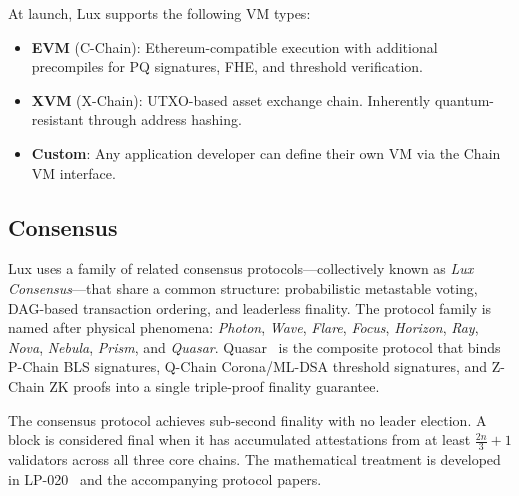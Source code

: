 At launch, Lux supports the following VM types:

\begin{itemize}[nosep]
  \item \textbf{EVM} (C-Chain): Ethereum-compatible execution with
        additional precompiles for PQ signatures, FHE, and threshold
        verification.
  \item \textbf{XVM} (X-Chain): UTXO-based asset exchange chain.
        Inherently quantum-resistant through address hashing.
  \item \textbf{Custom}: Any application developer can define their
        own VM via the Chain VM interface.
\end{itemize}

\subsection{Consensus}

Lux uses a family of related consensus protocols---collectively known
as \emph{Lux Consensus}---that share a common structure: probabilistic
metastable voting, DAG-based transaction ordering, and leaderless
finality. The protocol family is named after physical phenomena:
\emph{Photon}, \emph{Wave}, \emph{Flare}, \emph{Focus}, \emph{Horizon},
\emph{Ray}, \emph{Nova}, \emph{Nebula}, \emph{Prism}, and
\emph{Quasar}. Quasar~\cite{lp105} is the composite protocol that
binds P-Chain BLS signatures, Q-Chain Corona/ML-DSA threshold
signatures, and Z-Chain ZK proofs into a single triple-proof finality
guarantee.

The consensus protocol achieves sub-second finality with no leader
election. A block is considered final when it has accumulated
attestations from at least $\frac{2n}{3} + 1$ validators across all
three core chains. The mathematical treatment is developed in
LP-020~\cite{lp105} and the accompanying protocol papers.

